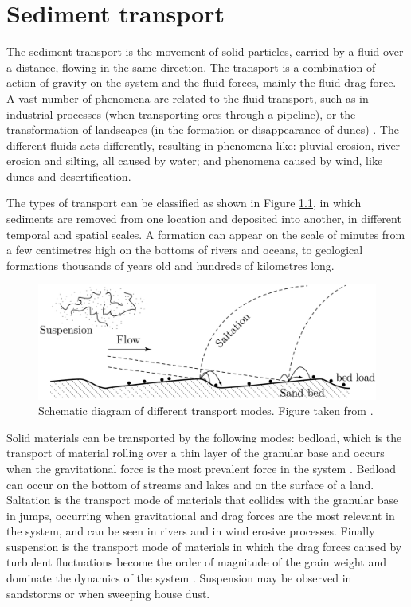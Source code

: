 \chapter{Sediment transport}
\label{chap:Transporte-Sedimentos}
    The sediment transport is the movement of solid particles, carried by a fluid over a distance, flowing in the same direction. The transport is a combination of action of gravity on the system and the fluid forces, mainly the fluid drag force. A vast number of phenomena are related to the fluid transport, such as in industrial processes (when transporting ores through a pipeline), or the transformation of landscapes (in the formation or disappearance of dunes) \cite{Granular_Media_Between_Fluid_and_Solid}. The different fluids acts differently, resulting in phenomena like: pluvial erosion, river erosion and silting, all caused by water; and phenomena caused by wind, like dunes and desertification. 

    The types of transport can be classified as shown in Figure \ref{fig:transport_mode}, in which sediments are removed from one location and deposited into another, in different temporal and spatial scales. A formation can appear on the scale of minutes from a few centimetres high on the bottoms of rivers and oceans, to geological formations thousands of years old and hundreds of kilometres long.

\begin{figure}[H]
    \centering
    \includegraphics[width = 0.75 \textwidth]{04-figuras/TransportModes.png}
    \caption[Transport modes.]{Schematic diagram of different transport modes. Figure taken from \cite{Granular_Media_Between_Fluid_and_Solid}.}
    \label{fig:transport_mode}
\end{figure}

    Solid materials can be transported by the following modes: bedload, which is the transport of material rolling over a thin layer of the granular base and occurs when the gravitational force is the most prevalent force in the system \cite{Bedforms_in_a_turbulent_stream}. Bedload can occur on the bottom of streams and lakes and on the surface of a land. Saltation is the transport mode of materials that collides with the granular base in jumps, occurring when gravitational and drag forces are the most relevant in the system, and can be seen in rivers and in wind erosive processes. Finally suspension is the transport mode of materials in which the drag forces caused by turbulent fluctuations become the order of magnitude of the grain weight and dominate the dynamics of the system \cite{FVSCS}. Suspension may be observed in sandstorms or when sweeping house dust. 

